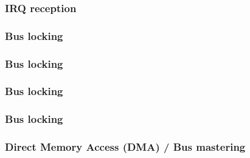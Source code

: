 
\begin{frame}
  \frametitle{IRQ reception}

  \begin{center}
  \end{center}

\end{frame}


\begin{frame}
  \frametitle{Bus locking}

  \begin{center}
  \end{center}

\end{frame}


\begin{frame}
  \frametitle{Bus locking}

  \begin{center}
  \end{center}

\end{frame}


\begin{frame}
  \frametitle{Bus locking}

  \begin{center}
  \end{center}

\end{frame}


\begin{frame}
  \frametitle{Bus locking}

  \begin{center}
  \end{center}

\end{frame}


\begin{frame}
  \frametitle{Direct Memory Access (DMA) / Bus mastering}

  \begin{center}
  \end{center}

\end{frame}

